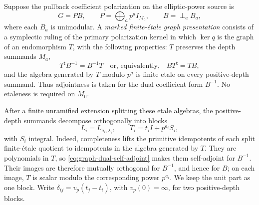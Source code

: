 Suppose the pullback coefficient polarization on the elliptic-power source is
\[
 G=PB,\qquad
 P=\bigoplus_a p^a I_{M_a},\qquad
 B=\mathop{\perp}_a B_a,
\]
where each \(B_a\) is unimodular.  A \emph{marked finite-\'etale graph
presentation} consists of a symplectic ruling of the primary polarization
kernel in which \(\ker q\) is the graph of an endomorphism \(T\), with the
following properties: \(T\) preserves the
depth summands \(M_a\),
\begin{equation}
 T^{\mathsf t}B^{-1}=B^{-1}T
 \quad\text{or, equivalently,}\quad BT^{\mathsf t}=TB,
 \label{eq:graph-dual-self-adjoint}
\end{equation}
and the algebra generated by \(T\) modulo \(p^a\) is finite etale on every
positive-depth summand.  Thus adjointness is taken for the dual coefficient
form \(B^{-1}\).  No etaleness is required on \(M_0\).

After a finite unramified extension splitting these etale algebras, the
positive-depth summands decompose orthogonally into blocks
\begin{equation}
 L_i=L_{a_i,\lambda_i},\qquad
 T_i=t_iI+p^{a_i}S_i,
 \label{eq:graph-split-block}
\end{equation}
with \(S_i\) integral.  Indeed, completeness lifts the primitive idempotents
of each split finite-\'etale quotient to idempotents in the algebra generated
by \(T\).  They are polynomials in \(T\), so
\eqref{eq:graph-dual-self-adjoint} makes them self-adjoint for
\(B^{-1}\).  Their images are therefore mutually orthogonal for \(B^{-1}\),
and hence for \(B\); on each image, \(T\) is scalar modulo the corresponding
power \(p^{a_i}\).  We keep the unit part as one block.  Write
\(\delta_{ij}=v_p(t_j-t_i)\), with \(v_p(0)=\infty\), for two
positive-depth blocks.

